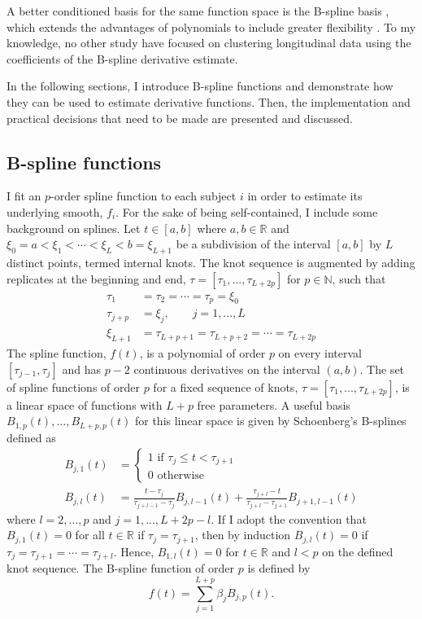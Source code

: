 A better conditioned basis for the same function space is the B-spline basis \cite{deboor1978, schumaker1981,curry1966, de1976}, which extends the advantages of polynomials to include greater flexibility \cite{abraham2003}. To my knowledge, no other study have focused on clustering longitudinal data using the coefficients of the B-spline derivative estimate.

In the following sections, I introduce B-spline functions and demonstrate how they can be used to estimate derivative functions. Then, the implementation and practical decisions that need to be made are presented and discussed.

\subsection{B-spline functions}\label{sec:bsplines}
I fit an $p$-order spline function to each subject $i$ in order to estimate its underlying smooth, $f_i$. For the sake of being self-contained, I include some background on splines. Let $t\in[a,b]$ where $a,b\in\mathbb{R}$ and $\xi_0=a<\xi_{1}<\cdots<\xi_{L} < b = \xi_{L+1}$ be a subdivision of  the interval $[a,b]$ by $L$ distinct points, termed internal knots. The knot sequence is augmented by adding replicates at the beginning and end, $\tau=[\tau_{1},...,\tau_{L+2p}]$ for $p\in\mathbb{N}$, such that 
\begin{align*}
\tau_{1}&=\tau_{2}=\cdots =\tau_{p} =\xi_{0}\\
\tau_{j+p}& = \xi_{j}, \quad\quad j=1,...,L\\
\xi_{L+1}&=\tau_{L+p+1}=\tau_{L+p+2}=\cdots =\tau_{L+2p} 
\end{align*}
The spline function, $f(t)$, is a polynomial of order $p$ on every interval $[\tau_{j-1},\tau_{j}]$ and has $p-2$ continuous derivatives on the interval $(a,b)$. The set of spline functions of order $p$ for a fixed sequence of knots, $\tau = [\tau_1,...,\tau_{L+2p}]$, is a linear space of functions with $L+p$ free parameters. A useful basis $B_{1,p}(t),...,B_{L+p,p}(t)$ for this linear space is given by Schoenberg's B-splines \cite{curry1966, de1976} defined as
\begin{align*}
B_{j,1}(t) &= \begin{cases}
1 \text{ if }\tau_j\leq t < \tau_{j+1}\\
0\text{ otherwise}
\end{cases}\\
B_{j,l}(t) &= \frac{t-\tau_j}{\tau_{j+l-1}-\tau_j} B_{j,l-1}(t)+\frac{\tau_{j+l}-t}{\tau_{j+l}-\tau_{j+1}} B_{j+1,l-1}(t)
\end{align*}
where $l=2,...,p$ and $j=1,...,L+2p-l$.  If I adopt the convention that $B_{j,1}(t)=0$ for all $t\in\mathbb{R}$ if $\tau_{j}=\tau_{j+1}$, then by induction $B_{j,l}(t)=0$ if $\tau_{j}=\tau_{j+1}=\cdots=\tau_{j+l}$. Hence, $B_{1,l}(t)=0$ for $t\in\mathbb{R}$ and $l<p$ on the defined knot sequence. The B-spline function of order $p$ is defined by
$$f(t) = \sum^{L+p}_{j=1} \beta_j B_{j,p}(t).$$

